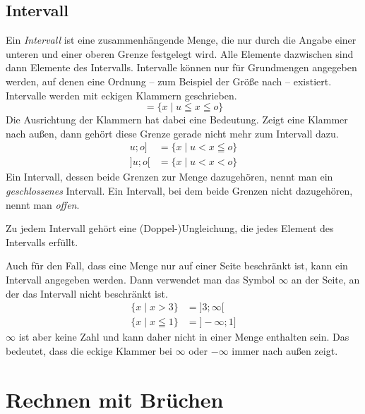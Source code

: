 \subsection{Intervall}

\begin{defi}[Intervall]
 Ein \emph{Intervall} ist eine zusammenhängende Menge, die nur durch die Angabe einer unteren und einer oberen Grenze festgelegt wird. Alle Elemente dazwischen sind dann Elemente des Intervalls. Intervalle können nur für Grundmengen angegeben werden, auf denen eine Ordnung -- zum Beispiel der Größe nach -- existiert. Intervalle werden mit eckigen Klammern geschrieben. 
 \begin{equation*}
  [u;o] = \lbrace x \mid u \leqq x \leqq o \rbrace
 \end{equation*}
 Die Ausrichtung der Klammern hat dabei eine Bedeutung. Zeigt eine Klammer nach außen, dann gehört diese Grenze gerade nicht mehr zum Intervall dazu.
 \begin{align*}
  [u;o[ &= \lbrace x \mid u \leqq x < o \rbrace \\
  ]u;o] &= \lbrace x \mid u < x \leqq o \rbrace \\
  ]u;o[ &= \lbrace x \mid u < x < o \rbrace
 \end{align*}
 Ein Intervall, dessen beide Grenzen zur Menge dazugehören, nennt man ein \emph{geschlossenes} Intervall. Ein Intervall, bei dem beide Grenzen nicht dazugehören, nennt man \emph{offen}.
 
 Zu jedem Intervall gehört eine (Doppel-)Ungleichung, die jedes Element des Intervalls erfüllt.
\end{defi}

\begin{beme}
 Auch für den Fall, dass eine Menge nur auf einer Seite beschränkt ist, kann ein Intervall angegeben werden. Dann verwendet man das Symbol \(\infty\) an der Seite, an der das Intervall nicht beschränkt ist.
 \begin{align*}
  \lbrace x\mid x>3 \rbrace &= ]3;\infty[ \\
  \lbrace x\mid x\leqq 1 \rbrace &= ]-\infty;1]
 \end{align*}
 \(\infty\) ist aber keine Zahl und kann daher nicht in einer Menge enthalten sein. Das bedeutet, dass die eckige Klammer bei \(\infty\) oder \(-\infty\) immer nach außen zeigt.
\end{beme}




\section{Rechnen mit Brüchen}
\label{sec:bruchrechnen}


